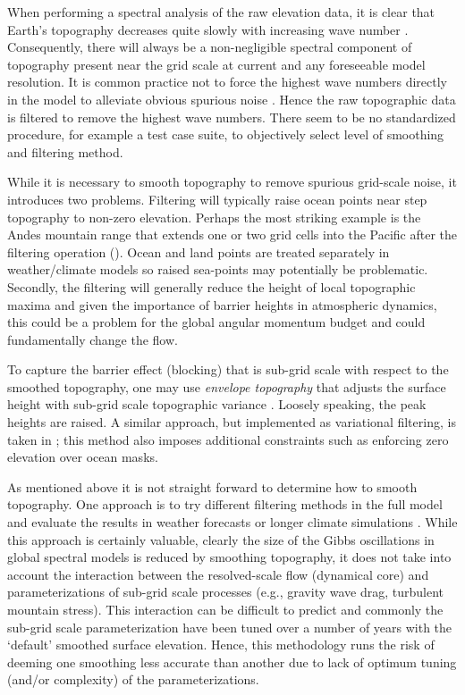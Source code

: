\documentclass[gmd]{copernicus}
\begin{document}
When performing a spectral analysis of the raw elevation data, it is clear that Earth's topography decreases quite slowly with increasing wave number \citep[see, e.g., ][]{B1993GRL}. Consequently, there will always be a non-negligible spectral component of topography present near the grid scale at current and any foreseeable model resolution. It is common practice not to force the highest wave numbers directly in the model to alleviate obvious spurious noise \citep[e.g.][]{NSM1994JC,LH1997MWR}. Hence the raw topographic data is filtered to remove the highest wave numbers. There seem to be no standardized procedure, for example a test case suite, to objectively select level of smoothing and filtering method. 

While it is necessary to smooth topography to remove spurious grid-scale noise, it introduces two problems. Filtering will typically raise ocean points near step topography to non-zero elevation. Perhaps the most striking example is the Andes mountain range that extends one or two grid cells into the Pacific after the filtering operation ({\color{red}{Figure??}}). Ocean and land points are treated separately in weather/climate models so raised sea-points may potentially be problematic. Secondly, the filtering will generally reduce the height of local topographic maxima and given the importance of barrier heights in atmospheric dynamics, this could be a problem for the global angular momentum budget and could fundamentally change the flow. 

To capture the barrier effect (blocking) that is sub-grid scale with respect to the smoothed topography, one may use {\em{envelope topography}} that adjusts the surface height with sub-grid scale topographic variance \citep{WTS1983QJRMS}. Loosely speaking, the peak heights are raised. A similar approach, but implemented as variational filtering, is taken in \cite{RTS2006QJRMS}; this method also imposes additional constraints such as enforcing zero elevation over ocean masks.

As mentioned above it is not straight forward to determine how to smooth topography. One approach is to try different filtering methods in the full model and evaluate the results in weather forecasts or longer climate simulations \citep{NSM1994JC,B1995QJRMS,H1996JC}. While this approach is certainly valuable, clearly the size of the Gibbs oscillations in global spectral models is reduced by smoothing topography, it does not take into account the interaction between the resolved-scale flow (dynamical core) and parameterizations of sub-grid scale processes (e.g., gravity wave drag, turbulent mountain stress). This interaction can be difficult to predict and commonly the sub-grid scale parameterization have been tuned over a number of years with the `default' smoothed surface elevation. Hence, this methodology runs the risk of deeming one smoothing less accurate than another due to lack of optimum tuning (and/or complexity) of the parameterizations.
\end{document}
